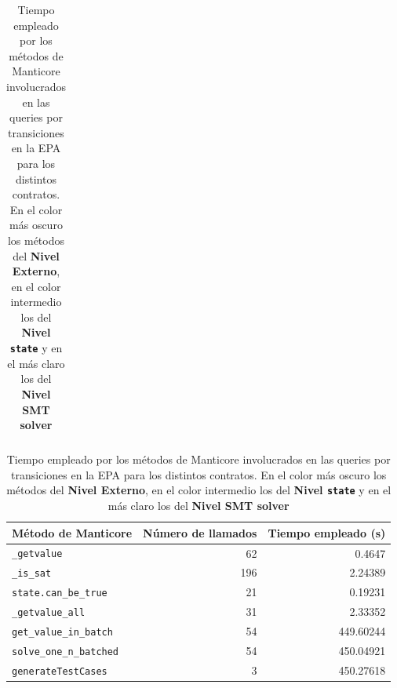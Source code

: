 \begin{table}[ht]
\begin{minipage}{0.95\textwidth}
\begin{tabular}[t]{l @{\hskip 30pt} r @{\hskip 30pt} r}
            \bottomrule
        \end{tabular}
        \caption{Tiempo empleado por los métodos de Manticore para el contrato \texttt{RoomThermostat}.}
    \end{minipage}
    \begin{minipage}{0.95\textwidth}
        \centering
        \begin{tabular}[t]{l @{\hskip 30pt} r @{\hskip 30pt} r}
            \toprule
            \textbf{Método de Manticore}                      & \textbf{Número de llamados} & \textbf{Tiempo empleado (s)} \\
            \midrule
            \rowcolor{color1} \texttt{\_getvalue}             & 62                          & 0.4647                       \\
            \rowcolor{color1} \texttt{\_is\_sat}              & 196                         & 2.24389                      \\
            \rowcolor{color2} \texttt{state.can\_be\_true}    & 21                          & 0.19231                      \\
            \rowcolor{color1} \texttt{\_getvalue\_all}        & 31                          & 2.33352                      \\
            \rowcolor{color2} \texttt{get\_value\_in\_batch}  & 54                          & 449.60244                    \\
            \rowcolor{color2} \texttt{solve\_one\_n\_batched} & 54                          & 450.04921                    \\
            \rowcolor{color3} \texttt{generateTestCases}      & 3                           & 450.27618                    \\
            \bottomrule
        \end{tabular}
        \caption{Tiempo empleado por los métodos de Manticore para el contrato \texttt{BasicProvenance}.}
    \end{minipage}
    \caption*{Tiempo empleado por los métodos de Manticore involucrados en las queries por transiciones en la EPA para los distintos contratos. En el color más oscuro los métodos del \textbf{Nivel Externo}, en el color intermedio los del \textbf{Nivel \texttt{state}} y en el más claro los del \textbf{Nivel SMT solver}}
\end{table}
